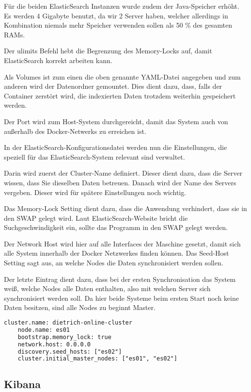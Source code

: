 Für die beiden ElasticSearch Instanzen wurde zudem der Java-Speicher erhöht. Es werden 4 Gigabyte benutzt, da wir 2 Server haben, welcher allerdings in Kombination niemals mehr Speicher verwenden sollen als 50 \% des gesamten RAMs. \cite{ElasticsearchB.V..12172019}

Der ulimits Befehl hebt die Begrenzung des Memory-Locks auf, damit ElasticSearch korrekt arbeiten kann.

Als Volumes ist zum einen die oben genannte YAML-Datei angegeben und zum anderen wird der Datenordner gemountet. Dies dient dazu, dass, falls der Container zerstört wird, die indexierten Daten trotzdem weiterhin gespeichert werden.

Der Port wird zum Host-System durchgereicht, damit das System auch von außerhalb des Docker-Netwerks zu erreichen ist.

In der ElasticSearch-Konfigurationsdatei werden nun die Einstellungen, die speziell für das ElasticSearch-System relevant sind verwaltet. 

Darin wird zuerst der Cluster-Name definiert. Dieser dient dazu, dass die Server wissen, dass Sie dieselben Daten betreuen. 
Danach wird der Name des Servers vergeben. Dieser wird für spätere Einstellungen noch wichtig.

Das Memory-Lock Setting dient dazu, dass die Anwendung verhindert, dass sie in den SWAP gelegt wird. Laut ElasticSearch-Website bricht die Suchgeschwindigkeit ein, sollte das Programm in den SWAP gelegt werden.

Der Network Host wird hier auf alle Interfaces der Maschine gesetzt, damit sich alle System innerhalb der Docker Netzwerkes finden können.
Das Seed-Host Setting sagt aus, an welche Nodes die Daten synchronisiert werden sollen.

Der letzte Eintrag dient dazu, dass bei der ersten Synchronisation das System weiß, welche Nodes alle Daten enthalten, also mit welchen Server sich synchronisiert werden soll. Da hier beide Systeme beim ersten Start noch keine Daten besitzen, sind alle Nodes zu beginnt Master. 
\begin{lstlisting}[language=XML, frame=single, label={lst:es01-yml}] 
	cluster.name: dietrich-online-cluster
	node.name: es01
	bootstrap.memory_lock: true
	network.host: 0.0.0.0
	discovery.seed_hosts: ["es02"]
	cluster.initial_master_nodes: ["es01", "es02"]
\end{lstlisting}

\subsection{Kibana}

